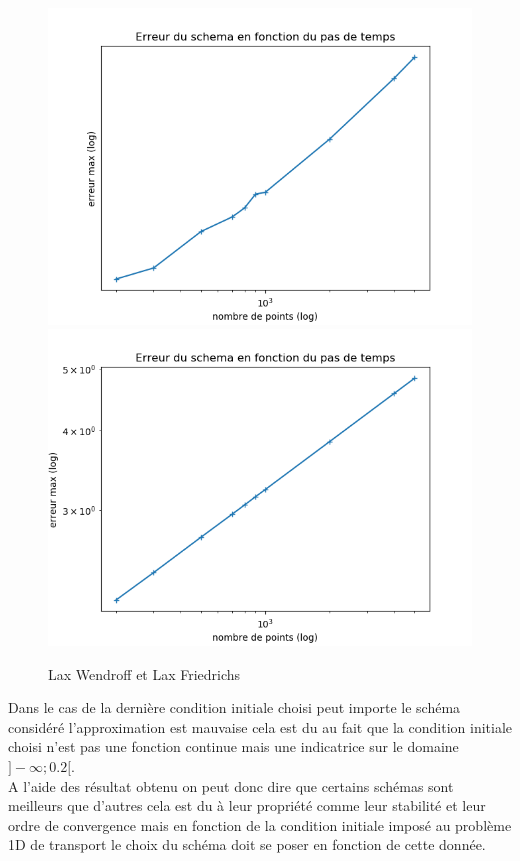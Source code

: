 \documentclass[12pt]{article}
\begin{document}
\begin{figure}[H]
	\centering
	\includegraphics[scale=0.40]{erreur_schema3_init3.png}
	\includegraphics[scale=0.40]{erreur_schema5_init3.png}
	\caption{Lax Wendroff et Lax Friedrichs}
	\label{1D}
	\end{figure}
Dans le cas de la dernière condition initiale choisi peut importe le schéma considéré l'approximation est mauvaise cela est du au fait que la condition initiale choisi n'est pas une fonction continue mais une indicatrice sur le domaine $]-\infty;0.2[$. 
\\A l'aide des résultat obtenu on peut donc dire que certains schémas sont meilleurs que d'autres cela est du à leur propriété comme leur stabilité et leur ordre de convergence mais en fonction de la condition initiale imposé au problème 1D de transport le choix du schéma doit se poser en fonction de cette donnée. 
\end{document}
